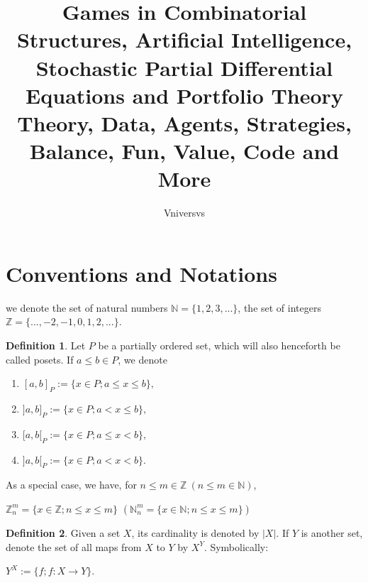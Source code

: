 \documentclass[]{article}
\title{%
	Games in Combinatorial Structures, Artificial Intelligence, Stochastic Partial Differential Equations and Portfolio Theory \\
	\large Theory, Data, Agents, Strategies, Balance, Fun, Value, Code and More\\}
\author{Vniversvs}
\theoremstyle{definition}
\newtheorem{definition}{Definition}[section]
\theoremstyle{definition}
\newcommand{\raw}{\rightarrow}
\newcommand{\bb}{\mathbb}
\begin{document}
\maketitle

\begin{abstract}

\end{abstract}

\tableofcontents

\section{Conventions and Notations}

we denote the set of natural numbers $\bb{N} = \{1, 2, 3, ... \}$, the set of integers $\bb{Z} = \{..., -2,-1,0,1,2,... \}$. 

\begin{definition}
Let $P$ be a partially ordered set, which will also henceforth be called posets.	If $a \leq b \in P$, we denote 

\begin{center}
	\begin{enumerate}
		\item 	$[a,b]_P :=\{x \in P; a\leq x\leq b\},$
		\item 	$]a,b]_P :=\{x \in P; a < x\leq b\},$
		\item 	$[a,b[_P :=\{x \in P; a\leq x < b\},$		
		\item 	$]a,b[_P :=\{x \in P; a < x < b\}.$
	\end{enumerate}

\end{center}

\end{definition}

As a special case, we have, for $n \leq m \in \bb{Z}\  (n \leq m \in \bb{N})$, 

\begin{center}
	$\bb{Z}_n^m=\{x\in\bb{Z}; n\leq x \leq m\}$ $(\bb{N}_n^m=\{x\in\bb{N}; n\leq x \leq m\})$
\end{center}

\begin{definition}
Given a set $X$, its cardinality is denoted by $|X|$. If $Y$ is another set, denote the set of all maps from $X$ to $Y$ by $X^Y$. Symbolically:

\begin{center}
	$Y^X := \{f; f:X \raw Y\} $.
\end{center}

\end{definition}
\end{document}

